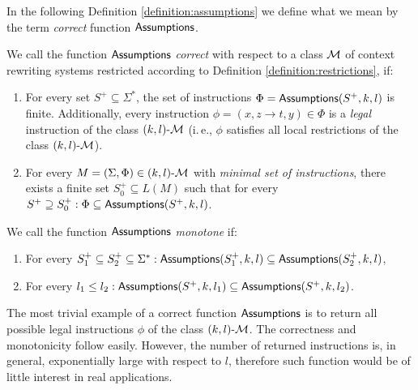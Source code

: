 In the following Definition \ref{definition:assumptions} we define what we mean by the term \emph{correct} function $\textup{\sf Assumptions}$.

\begin{definition}\label{definition:assumptions}
We call the function $\textup{\sf Assumptions}$ \emph{correct} with respect to a class $\textup{\sf $\mathcal{M}$}$ of context rewriting systems restricted according to Definition \ref{definition:restrictions}, if:
\begin{enumerate}
\item For every set $S^+ \subseteq \Sigma^*$, the set of instructions $\Phi = \textup{\sf Assumptions}(S^+, k, l)$ is finite. Additionally, every instruction $\phi = (x, z \to t, y) \in \Phi$ is a \emph{legal} instruction of the class $\textup{\sf $(k,l)$-\textup{\sf $\mathcal{M}$}}$ (i.\,e., $\phi$ satisfies all local restrictions of the class $\textup{\sf $(k,l)$-\textup{\sf $\mathcal{M}$}}$).
\item For every $M = (\Sigma, \Phi) \in \textup{\sf $(k,l)$-\textup{\sf $\mathcal{M}$}}$  with \emph{minimal set of instructions}, there exists a finite set $S_0^+ \subseteq L(M)$ such that for every $S^+ \supseteq S_0^+: \Phi \subseteq \textup{\sf Assumptions}(S^+, k, l)$.
\end{enumerate}
\end{definition}

\begin{definition}\label{definition:monotone-assumptions}
We call the function $\textup{\sf Assumptions}$ \emph{monotone} if:
\begin{enumerate}
\item For every $S_1^+ \subseteq S_2^+ \subseteq \Sigma^*:
\textup{\sf Assumptions}(S_1^+, k, l) \subseteq \textup{\sf Assumptions}(S_2^+, k, l)$,
\item For every $l_1 \le l_2:
\textup{\sf Assumptions}(S^+, k, l_1) \subseteq \textup{\sf Assumptions}(S^+, k, l_2)$.
\end{enumerate}
\end{definition}

\begin{example}
The most trivial example of a correct function $\textup{\sf Assumptions}$ is to return all possible legal instructions $\phi$ of the class $\textup{\sf $(k,l)$-\textup{\sf $\mathcal{M}$}}$. The correctness and monotonicity follow easily. However, the number of returned instructions is, in general, exponentially large with respect to $l$, therefore such function would be of little interest in real applications.
\end{example}

